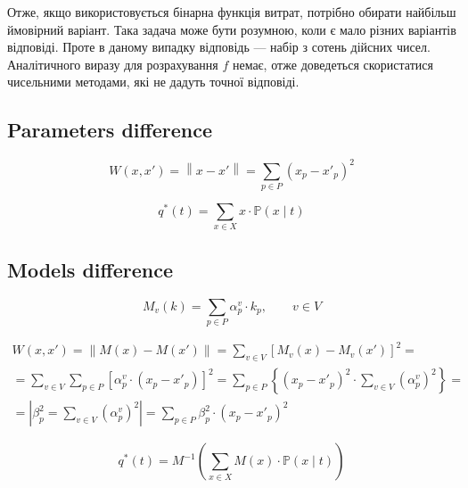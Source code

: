 Отже, якщо використовується бінарна функція витрат,
потрібно обирати найбільш ймовірний варіант.
Така задача може бути розумною, коли є мало різних варіантів відповіді.
Проте в даному випадку відповідь --- набір з сотень дійсних чисел.
Аналітичного виразу для розрахування $f$ немає,
отже доведеться скористатися чисельними методами,
які не дадуть точної відповіді.

\subsection{Parameters difference}

\begin{equation*}
  W \left( x, x' \right)
  = \left\| x - x' \right\|
  = \sum_{p \in P} \left( x_p - x'_p \right)^2
\end{equation*}

\begin{equation*}
  q^* \left( t \right)
  = \sum_{x \in X} x \cdot \mathbb{P}\left( x \mid t \right)
\end{equation*}

\subsection{Models difference}

\begin{equation*}
  M_v\left( k \right) = \sum_{p \in P} \alpha_p^v \cdot k_p, \qquad v \in V
\end{equation*}

\begin{equation*}
    \begin{split}
      W \left( x, x' \right)
      = \left\| M\left( x \right) - M\left( x' \right) \right\|
      = \sum_{v \in V} \left[
          M_v\left( x \right) - M_v\left( x' \right)
        \right]^2 = \\
      = \sum_{v \in V} \sum_{p \in P} \left[
          \alpha_p^v \cdot \left( x_p - x'_p \right)
        \right]^2
      = \sum_{p \in P} \left\{ \left( x_p - x'_p \right)^2
        \cdot \sum_{v \in V} \left( \alpha_p^v \right)^2 \right\} = \\
      = \left| \beta_p^2 = \sum_{v \in V} \left( \alpha_p^v \right)^2 \right|
      = \sum_{p \in P}
          \beta_p^2 \cdot \left( x_p - x'_p \right)^2
    \end{split}
\end{equation*}

\begin{equation*}
  q^* \left( t \right)
  = M^{-1} \left(
      \sum_{x \in X} M\left( x \right) \cdot \mathbb{P}\left( x \mid t \right)
    \right)
\end{equation*}
